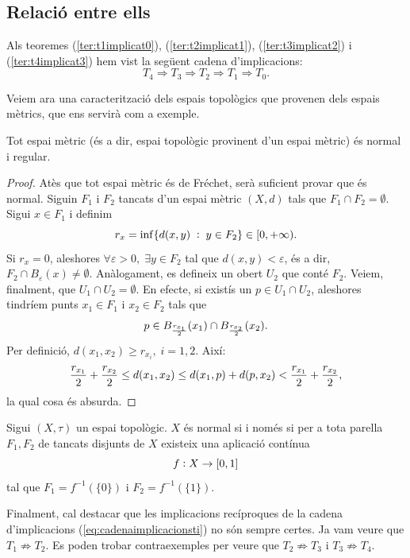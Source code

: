 \documentclass[../main.tex]{subfiles}
\begin{document}
\subsection{Relació entre ells}

Als teoremes (\ref{ter:t1implicat0}), (\ref{ter:t2implicat1}), (\ref{ter:t3implicat2}) i (\ref{ter:t4implicat3}) hem vist la següent cadena d'implicacions:
\begin{equation}
    \label{eq:cadenaimplicacionsti}
    T_4 \Rightarrow T_3 \Rightarrow T_2 \Rightarrow T_1 \Rightarrow T_0.
\end{equation}

Veiem ara una caracterització dels espais topològics que provenen dels espais mètrics, que ens servirà com a exemple.

\begin{prop}
\label{prop:totespaimetricest4} Tot espai mètric (és a dir, espai topològic provinent d'un espai mètric) és normal i regular.
\end{prop}
\begin{proof}
Atès que tot espai mètric és de Fréchet, serà suficient provar que és normal. Siguin $F_1$ i $F_2$ tancats d'un espai mètric $(X,d)$ tals que $F_1\cap F_2 = \emptyset$. Sigui $x\in F_1$ i definim
\begin{equation}
    \notag
    r_x = \inf\{d(x,y)\;:\;y\in F_2\}\in[0,+\infty).
\end{equation}
Si $r_x = 0$, aleshores $\forall\varepsilon>0,\;\exists y\in F_2$ tal que $d(x,y)<\varepsilon$, és a dir, $F_2\cap B_\varepsilon(x)\not=\emptyset$. Anàlogament, es defineix un obert $U_2$ que conté $F_2$. Veiem, finalment, que $U_1\cap U_2 = \emptyset$. En efecte, si existís un $p\in U_1\cap U_2$, aleshores tindríem punts $x_1\in F_1$ i $x_2\in F_2$ tals que
\begin{equation}
    \notag
    p\in B_{\frac{r_{x_1}}{2}}(x_1)\cap B_{\frac{r_{x_2}}{2}}(x_2).
\end{equation}
Per definició, $d(x_1,x_2)\geq r_{x_i},\;i=1,2$. Així:
\begin{equation}
    \notag
    \frac{r_{x_1}}{2}+\frac{r_{x_2}}{2}\leq d(x_1,x_2)\leq d(x_1,p)+d(p,x_2)<\frac{r_{x_1}}{2}+\frac{r_{x_2}}{2},
\end{equation}
la qual cosa és absurda.
\end{proof}

\begin{lema}
\label{lema:lemadeurysohn} Sigui $(X,\tau)$ un espai topològic. $X$ és normal si i només si per a tota parella $F_1,F_2$ de tancats disjunts de $X$ existeix una aplicació contínua
\begin{equation}
    \notag
    f:X\rightarrow [0,1]
\end{equation}
tal que $F_1 = f^{-1}(\{0\})$ i $F_2 = f^{-1}(\{1\})$.
\end{lema}

Finalment, cal destacar que les implicacions recíproques de la cadena d'implicacions (\ref{eq:cadenaimplicacionsti}) no són sempre certes. Ja vam veure que $T_1\not\Rightarrow T_2$. Es poden trobar contraexemples per veure que $T_2\not\Rightarrow T_3$ i $T_3\not\Rightarrow T_4$.
\end{document}
